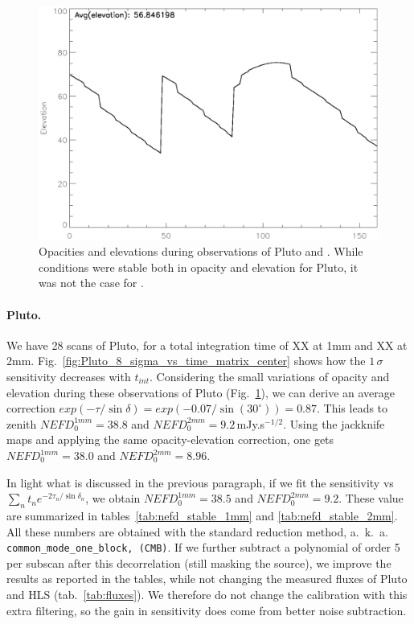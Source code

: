 \begin{figure}[htpb]
\begin{center}
\includegraphics[clip, angle=0, scale=0.4]{Figures/HLS091828_5_elevation.eps}
\caption[Observing conditions during the noise integration tests]{Opacities and elevations during observations of Pluto and \hls. While
  conditions were stable both in opacity and elevation for Pluto, it was not the
case for \hls.}
\label{fig:pluto_opacities}
\end{center}
\end{figure}

\paragraph{Pluto.} We have 28 scans of Pluto, for a total
integration time of XX at 1mm and XX at
2mm. Fig.~\ref{fig:Pluto_8_sigma_vs_time_matrix_center} shows how the
$1\,\sigma$ sensitivity decreases with $t_{int}$. Considering the small
variations of opacity and elevation during these observations of Pluto
(Fig.~\ref{fig:pluto_opacities}), we can derive an average correction
$exp(-\tau/\sin\delta) = exp(-0.07/\sin(30^\circ)) = 0.87$. This leads to zenith
$NEFD_0^{1mm} = 38.8$ and $NEFD_0^{2mm} = 9.2$\,mJy.s$^{-1/2}$. Using the
jackknife maps and applying the same opacity-elevation correction, one gets
$NEFD_0^{1mm}=38.0$ and $NEFD_0^{2mm}=8.96$.

In light what is discussed in the previous paragraph, if we fit the sensitivity
vs $\sum_{n}t_n e^{-2\tau_n/\sin\delta_n}$, we obtain $NEFD_0^{1mm} = 38.5$ and
$NEFD_0^{2mm}=9.2$. These value are summarized in
tables~\ref{tab:nefd_stable_1mm} and \ref{tab:nefd_stable_2mm}. All these
numbers are obtained with the standard reduction method, a.~k.~a. {\tt
  common\_mode\_one\_block, (CMB)}. If we further subtract a polynomial of order
5 per subscan after this decorrelation (still masking the source), we improve
the results as reported in the tables, while not changing the measured fluxes of
Pluto and HLS (tab.~\ref{tab:fluxes}). We therefore do not change the
calibration with this extra filtering, so the gain in sensitivity does come from
better noise subtraction.

